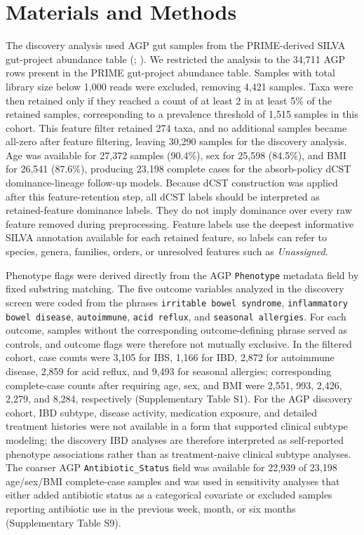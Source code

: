 \documentclass[
  11pt,
]{article}
\begin{document}
\section{Materials and Methods}\label{methods}

The discovery analysis used AGP gut samples from the PRIME-derived SILVA
gut-project abundance table (; ). We
restricted the analysis to the 34,711 AGP rows present in the PRIME
gut-project abundance table. Samples with total library size below
1,000 reads were excluded, removing 4,421 samples. Taxa were then
retained only if they reached a count of at least 2 in at least 5\% of
the retained samples, corresponding to a prevalence threshold of 1,515
samples in this cohort. This feature filter retained 274 taxa, and no
additional samples became all-zero after feature filtering, leaving
30,290 samples for the discovery analysis. Age was available for 27,372
samples (90.4\%), sex for 25,598 (84.5\%), and BMI for 26,541
(87.6\%), producing 23,198 complete cases for the absorb-policy dCST
dominance-lineage follow-up models. Because dCST construction was applied
after this feature-retention step, all dCST labels should be interpreted as
retained-feature dominance labels. They do not imply dominance over every
raw feature removed during preprocessing. Feature labels use the deepest
informative SILVA annotation available for each retained feature, so
labels can refer to species, genera, families, orders, or unresolved
features such as \emph{Unassigned}.

Phenotype flags were derived directly from the AGP \texttt{Phenotype}
metadata field by fixed substring matching. The five outcome variables
analyzed in the discovery screen were coded from the phrases
\texttt{irritable bowel syndrome},
\texttt{inflammatory bowel disease}, \texttt{autoimmune},
\texttt{acid reflux}, and \texttt{seasonal allergies}. For each outcome,
samples without the corresponding outcome-defining phrase served as
controls, and outcome flags were therefore not mutually exclusive. In the filtered cohort, case
counts were 3,105 for IBS, 1,166 for IBD, 2,872 for autoimmune disease,
2,859 for acid reflux, and 9,493 for seasonal allergies; corresponding
complete-case counts after requiring age, sex, and BMI were 2,551, 993,
2,426, 2,279, and 8,284, respectively (Supplementary Table S1). For the
AGP discovery cohort, IBD subtype, disease activity, medication exposure,
and detailed treatment histories were not available in a form that
supported clinical subtype modeling; the discovery IBD analyses are
therefore interpreted as self-reported phenotype associations rather than
as treatment-naive clinical subtype analyses. The coarser AGP
\texttt{Antibiotic\_Status} field was available for 22,939 of 23,198
age/sex/BMI complete-case samples and was used in sensitivity analyses
that either added antibiotic status as a categorical covariate or
excluded samples reporting antibiotic use in the previous week, month, or
six months (Supplementary Table S9).
\end{document}
